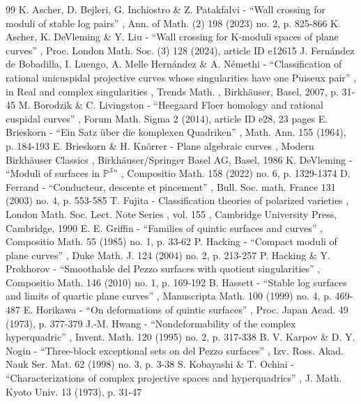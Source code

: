 \documentclass[11pt]{article}
\theoremstyle{plain}
\theoremstyle{definition}
\begin{document}
\begin{thebibliography}{99}
 K. Ascher, D. Bejleri, G. Inchiostro \& Z. Patakfalvi - “Wall crossing for moduli of stable log pairs” , Ann. of Math. (2) 198 (2023) no. 2, p. 825-866
 K. Ascher, K. DeVleming \& Y. Liu - “Wall crossing for K‐moduli spaces of plane curves” , Proc. London Math. Soc. (3) 128 (2024), article ID e12615
 J. Fernández de Bobadilla, I. Luengo, A. Melle Hernández \& A. Némethi - “Classification of rational unicuspidal projective curves whose singularities have one Puiseux pair” , in Real and complex singularities , Trends Math. , Birkhäuser, Basel, 2007, p. 31-45
 M. Borodzik \& C. Livingston - “Heegaard Floer homology and rational cuspidal curves” , Forum Math. Sigma 2 (2014), article ID e28, 23 pages
 E. Brieskorn - “Ein Satz über die komplexen Quadriken” , Math. Ann. 155 (1964), p. 184-193
 E. Brieskorn \& H. Knörrer - Plane algebraic curves , Modern Birkhäuser Classics , Birkhäuser/Springer Basel AG, Basel, 1986
 K. DeVleming - “Moduli of surfaces in $\mathbb{P}^3$” , Compositio Math. 158 (2022) no. 6, p. 1329-1374
 D. Ferrand - “Conducteur, descente et pincement” , Bull. Soc. math. France 131 (2003) no. 4, p. 553-585
 T. Fujita - Classification theories of polarized varieties , London Math. Soc. Lect. Note Series , vol. 155 , Cambridge University Press, Cambridge, 1990
 E. E. Griffin - “Families of quintic surfaces and curves” , Compositio Math. 55 (1985) no. 1, p. 33-62
 P. Hacking - “Compact moduli of plane curves” , Duke Math. J. 124 (2004) no. 2, p. 213-257
 P. Hacking \& Y. Prokhorov - “Smoothable del Pezzo surfaces with quotient singularities” , Compositio Math. 146 (2010) no. 1, p. 169-192
 B. Hassett - “Stable log surfaces and limits of quartic plane curves” , Manuscripta Math. 100 (1999) no. 4, p. 469-487
 E. Horikawa - “On deformations of quintic surfaces” , Proc. Japan Acad. 49 (1973), p. 377-379
 J.-M. Hwang - “Nondeformability of the complex hyperquadric” , Invent. Math. 120 (1995) no. 2, p. 317-338
 B. V. Karpov \& D. Y. Nogin - “Three-block exceptional sets on del Pezzo surfaces” , Izv. Ross. Akad. Nauk Ser. Mat. 62 (1998) no. 3, p. 3-38
 S. Kobayashi \& T. Ochiai - “Characterizations of complex projective spaces and hyperquadrics” , J. Math. Kyoto Univ. 13 (1973), p. 31-47

\end{thebibliography}
\end{document}
